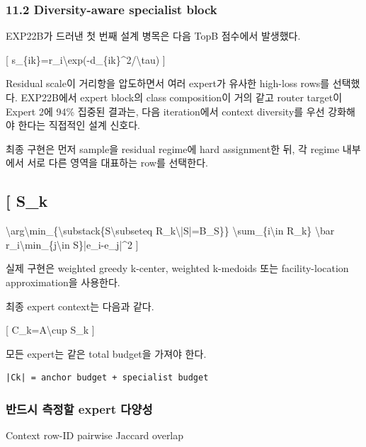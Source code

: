 \subsubsection{11.2 Diversity-aware specialist block}
EXP22B가 드러낸 첫 번째 설계 병목은 다음 TopB 점수에서 발생했다.

[ s\_\allowbreak{}\{ik\}=\allowbreak{}r\_\allowbreak{}i\textbackslash{}exp(-d\_\allowbreak{}\{ik\}\textasciicircum{}2/\allowbreak{}\textbackslash{}tau) ]

Residual scale이 거리항을 압도하면서 여러 expert가 유사한 high-loss rows를 선택했다. EXP22B에서 expert block의 class composition이 거의 같고 router target이 Expert 2에 94\% 집중된 결과는, 다음 iteration에서 context diversity를 우선 강화해야 한다는 직접적인 설계 신호다.

최종 구현은 먼저 sample을 residual regime에 hard assignment한 뒤, 각 regime 내부에서 서로 다른 영역을 대표하는 row를 선택한다.

\subsection{[ S\_\allowbreak{}k}
\textbackslash{}arg\textbackslash{}min\_\allowbreak{}\{\textbackslash{}substack\{S\textbackslash{}subseteq R\_\allowbreak{}k\textbackslash{}|S|=\allowbreak{}B\_\allowbreak{}S\}\} \textbackslash{}sum\_\allowbreak{}\{i\textbackslash{}in R\_\allowbreak{}k\} \textbackslash{}bar r\_\allowbreak{}i\textbackslash{}min\_\allowbreak{}\{j\textbackslash{}in S\}|e\_\allowbreak{}i-e\_\allowbreak{}j|\textasciicircum{}2 ]

실제 구현은 weighted greedy k-center, weighted k-medoids 또는 facility-location approximation을 사용한다.

최종 expert context는 다음과 같다.

[ C\_\allowbreak{}k=\allowbreak{}A\textbackslash{}cup S\_\allowbreak{}k ]

모든 expert는 같은 total budget을 가져야 한다.


\begin{Verbatim}[breaklines=true,breakanywhere=true,fontsize=\scriptsize]
|Ck| = anchor budget + specialist budget

\end{Verbatim}
\subsubsection{반드시 측정할 expert 다양성}
\par\noindent \textbullet\enspace Context row-ID pairwise Jaccard overlap



